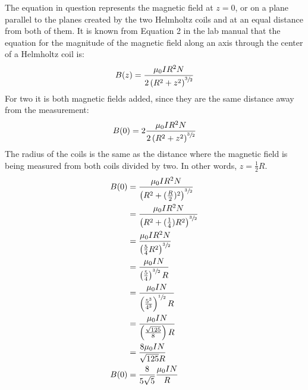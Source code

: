 \documentclass [12pt, letterpaper, twoside] {article}
\begin{document}
\begin{enumerate}
\begin{enumerate}
        The equation in question represents the magnetic field at \(z=0\), or on a plane parallel to the planes created by the two Helmholtz coils and at an equal distance from both of them. It is known from Equation 2 in the lab manual that the equation for the magnitude of the magnetic field along an axis through the center of a Helmholtz coil is:
        \begin{equation*}
          \begin{split}
            B(z) &= \dfrac{\mu_{0}IR^{2}N}{2\left(R^{2}+z^{2}\right)^{\sfrac{3}{2}}} \\
          \end{split}
        \end{equation*}
        For two it is both magnetic fields added, since they are the same distance away from the measurement:
        \begin{equation*}
          \begin{split}
            B(0) &= 2\dfrac{\mu_{0}IR^{2}N}{2\left(R^{2}+z^{2}\right)^{\sfrac{3}{2}}} \\
          \end{split}
        \end{equation*}
        The radius of the coils is the same as the distance where the magnetic field is being measured from both coils divided by two. In other words, \(z = \tfrac{1}{2}R\).
        \begin{equation*}
          \begin{split}
            B(0) &= \dfrac{\mu_{0}IR^{2}N}{\left(R^{2}+(\tfrac{R}{2})^{2}\right)^{\sfrac{3}{2}}} \\
                 &= \dfrac{\mu_{0}IR^{2}N}{\left(R^{2}+(\tfrac{1}{4})R^{2}\right)^{\sfrac{3}{2}}} \\
                 &= \dfrac{\mu_{0}IR^{2}N}{\left(\tfrac{5}{4}R^{2}\right)^{\sfrac{3}{2}}} \\
                 &= \dfrac{\mu_{0}IN}{\left(\tfrac{5}{4}\right)^{\sfrac{3}{2}}R} \\
                 &= \dfrac{\mu_{0}IN}{\left(\tfrac{5^{3}}{4^{3}}\right)^{\sfrac{1}{2}}R} \\
                 &= \dfrac{\mu_{0}IN}{\left(\tfrac{\sqrt{125}}{8}\right)R} \\
                 &= \dfrac{8\mu_{0}IN}{\sqrt{125}R} \\
            B(0) &= \dfrac{8}{5\sqrt{5}}\dfrac{\mu_{0}IN}{R} \\
          \end{split}
        \end{equation*}

\end{enumerate}
\end{enumerate}
\end{document}
